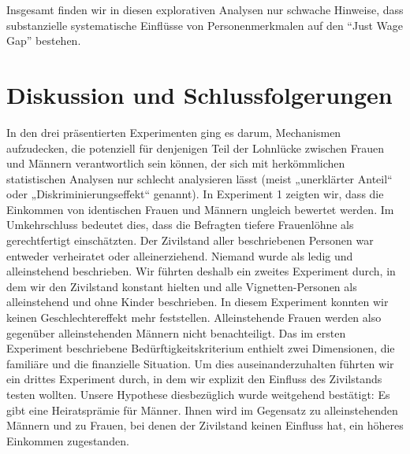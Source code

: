 \documentclass[a4paper,12pt]{article}
\begin{document}
Insgesamt finden wir in diesen explorativen Analysen nur schwache Hinweise, dass
substanzielle systematische Einflüsse von Personenmerkmalen auf den “Just Wage Gap” bestehen.

\section{Diskussion und Schlussfolgerungen}
\label{sec:s5}

In den drei präsentierten Experimenten ging es darum, Mechanismen aufzudecken, die
potenziell für denjenigen Teil der Lohnlücke zwischen Frauen und Männern
verantwortlich sein können, der sich mit herkömmlichen statistischen Analysen
nur schlecht analysieren lässt (meist „unerklärter Anteil“ oder
„Diskriminierungseffekt“ genannt). In Experiment 1 zeigten wir, dass die
Einkommen von identischen Frauen und Männern ungleich bewertet werden. Im
Umkehrschluss bedeutet dies, dass die Befragten tiefere Frauenlöhne als
gerechtfertigt einschätzten. Der Zivilstand aller beschriebenen Personen war
entweder verheiratet oder alleinerziehend. Niemand wurde als ledig und
alleinstehend beschrieben. Wir führten deshalb ein zweites Experiment durch, in
dem wir den Zivilstand konstant hielten und alle Vignetten-Personen als
alleinstehend und ohne Kinder beschrieben. In diesem Experiment konnten wir
keinen Geschlechtereffekt mehr feststellen. Alleinstehende Frauen werden also
gegenüber alleinstehenden Männern nicht benachteiligt. Das im ersten Experiment
beschriebene Bedürftigkeitskriterium enthielt zwei Dimensionen, die familiäre
und die finanzielle Situation. Um dies auseinanderzuhalten führten wir ein
drittes Experiment durch, in dem wir explizit den Einfluss des Zivilstands
testen wollten. Unsere Hypothese diesbezüglich wurde weitgehend bestätigt: Es
gibt eine Heiratsprämie für Männer. Ihnen wird im Gegensatz zu alleinstehenden
Männern und zu Frauen, bei denen der Zivilstand keinen Einfluss hat, ein
höheres Einkommen zugestanden.
\end{document}
